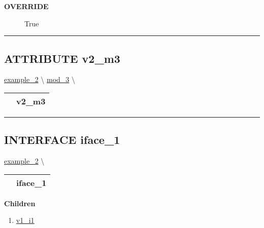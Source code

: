 \par
\begin{description}
\item [\colorbox{tagtype}{\color{white} \textbf{\textsf{OVERRIDE}}}] \textbf{\underline{}} True
\end{description}

\rule{\linewidth}{0.5pt}
\subsection*{\textsf{\colorbox{headtoc}{\color{white} ATTRIBUTE}
v2\_m3}}

\hypertarget{ecldoc:intest.inintest.example_2.mod_3.v2_m3}{}
\hspace{0pt} \hyperlink{ecldoc:intest.inintest.example_2}{example_2} \textbackslash 
\hspace{0pt} \hyperlink{ecldoc:intest.inintest.example_2.mod_3}{mod_3} \textbackslash 

{\renewcommand{\arraystretch}{1.5}
\begin{tabularx}{\textwidth}{|>{\raggedright\arraybackslash}l|X|}
\hline
\hspace{0pt}\mytexttt{\color{red} } & \textbf{v2\_m3} \\
\hline
\end{tabularx}
}

\par


\rule{\linewidth}{0.5pt}


\subsection*{\textsf{\colorbox{headtoc}{\color{white} INTERFACE}
iface\_1}}

\hypertarget{ecldoc:intest.inintest.example_2.iface_1}{}
\hspace{0pt} \hyperlink{ecldoc:intest.inintest.example_2}{example_2} \textbackslash 

{\renewcommand{\arraystretch}{1.5}
\begin{tabularx}{\textwidth}{|>{\raggedright\arraybackslash}l|X|}
\hline
\hspace{0pt}\mytexttt{\color{red} } & \textbf{iface\_1} \\
\hline
\end{tabularx}
}

\par


\textbf{Children}
\begin{enumerate}
\item \hyperlink{ecldoc:intest.inintest.example_2.iface_1.v1_i1}{v1\_i1}
\end{enumerate}

